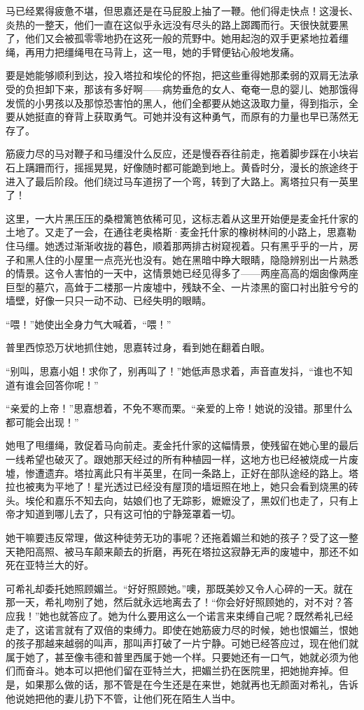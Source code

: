 \par 马已经累得疲惫不堪，但思嘉还是在马屁股上抽了一鞭。他们得走快点！这漫长、炎热的一整天，他们一直在这似乎永远没有尽头的路上踯躅而行。天很快就要黑了，他们又会被孤零零地扔在这死一般的荒野中。她用起泡的双手更紧地拉着缰绳，再用力把缰绳甩在马背上，这一甩，她的手臂便钻心般地发痛。
\par 要是她能够顺利到达，投入塔拉和埃伦的怀抱，把这些重得她那柔弱的双肩无法承受的负担卸下来，那该有多好啊——病势垂危的女人、奄奄一息的婴儿、她那饿得发慌的小男孩以及那惊恐害怕的黑人，他们全都要从她这汲取力量，得到指示，全要从她挺直的脊背上获取勇气。可她并没有这种勇气，而原有的力量也早已荡然无存了。
\par 筋疲力尽的马对鞭子和马缰没什么反应，还是慢吞吞往前走，拖着脚步踩在小块岩石上蹒跚而行，摇摇晃晃，好像随时都可能跪到地上。黄昏时分，漫长的旅途终于进入了最后阶段。他们绕过马车道拐了一个弯，转到了大路上。离塔拉只有一英里了！
\par 这里，一大片黑压压的桑橙篱笆依稀可见，这标志着从这里开始便是麦金托什家的土地了。又走了一会，在通往老奥格斯·麦金托什家的橡树林间的小路上，思嘉勒住马缰。她透过渐渐收拢的暮色，顺着那两排古树窥视着。只有黑乎乎的一片，房子和黑人住的小屋里一点亮光也没有。她在黑暗中睁大眼睛，隐隐辨别出一片熟悉的情景。这令人害怕的一天中，这情景她已经见得多了——两座高高的烟囱像两座巨型的墓穴，高耸于二楼那一片废墟中，残缺不全、一片漆黑的窗口衬出脏兮兮的墙壁，好像一只只一动不动、已经失明的眼睛。
\par “喂！”她使出全身力气大喊着，“喂！”
\par 普里西惊恐万状地抓住她，思嘉转过身，看到她在翻着白眼。
\par “别叫，思嘉小姐！求你了，别再叫了！”她低声恳求着，声音直发抖，“谁也不知道有谁会回答你呢！”
\par “亲爱的上帝！”思嘉想着，不免不寒而栗。“亲爱的上帝！她说的没错。那里什么都可能会出现！”
\par 她甩了甩缰绳，敦促着马向前走。麦金托什家的这幅情景，使残留在她心里的最后一线希望也破灭了。跟她那天经过的所有种植园一样，这地方也已经被烧成一片废墟，惨遭遗弃。塔拉离此只有半英里，在同一条路上，正好在部队途经的路上。塔拉也被夷为平地了！星光透过已经没有屋顶的墙垣照在地上，她只会看到烧黑的砖头。埃伦和嘉乐不知去向，姑娘们也了无踪影，嬷嬷没了，黑奴们也走了，只有上帝才知道到哪儿去了，只有这可怕的宁静笼罩着一切。
\par 她干嘛要违反常理，做这种徒劳无功的事呢？还拖着媚兰和她的孩子？受了这一整天艳阳高照、被马车颠来颠去的折磨，再死在塔拉这寂静无声的废墟中，那还不如死在亚特兰大的好。
\par 可希礼却委托她照顾媚兰。“好好照顾她。”噢，那既美妙又令人心碎的一天。就在那一天，希礼吻别了她，然后就永远地离去了！“你会好好照顾她的，对不对？答应我！”她也就答应了。她为什么要用这么一个诺言来束缚自己呢？既然希礼已经走了，这诺言就有了双倍的束缚力。即使在她筋疲力尽的时候，她也恨媚兰，恨她的孩子那越来越弱的叫声，那叫声打破了一片宁静。可她已经答应过，现在他们就属于她了，甚至像韦德和普里西属于她一个样。只要她还有一口气，她就必须为他们而奋斗。她本可以把他们留在亚特兰大，把媚兰扔在医院里，把她抛弃掉。但是，如果那么做的话，那不管是在今生还是在来世，她就再也无颜面对希礼，告诉他说她把他的妻儿扔下不管，让他们死在陌生人当中。

